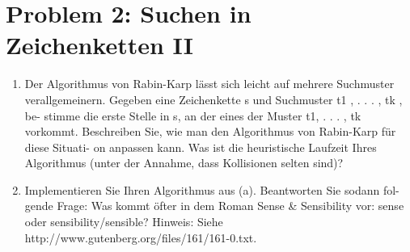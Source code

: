 \section*{Problem 2: Suchen in Zeichenketten II}

\begin{enumerate}
\item Der Algorithmus von Rabin-Karp lässt sich leicht auf mehrere Suchmuster
verallgemeinern. Gegeben eine Zeichenkette s und Suchmuster t1 , . . . , tk , be-
stimme die erste Stelle in s, an der eines der Muster t1, . . . , tk vorkommt.
Beschreiben Sie, wie man den Algorithmus von Rabin-Karp für diese Situati-
on anpassen kann. Was ist die heuristische Laufzeit Ihres Algorithmus (unter
der Annahme, dass Kollisionen selten sind)?

\item Implementieren Sie Ihren Algorithmus aus (a). Beantworten Sie sodann fol-
gende Frage: Was kommt öfter in dem Roman Sense \& Sensibility vor: sense
oder sensibility/sensible?
Hinweis: Siehe http://www.gutenberg.org/files/161/161-0.txt.
\end{enumerate}